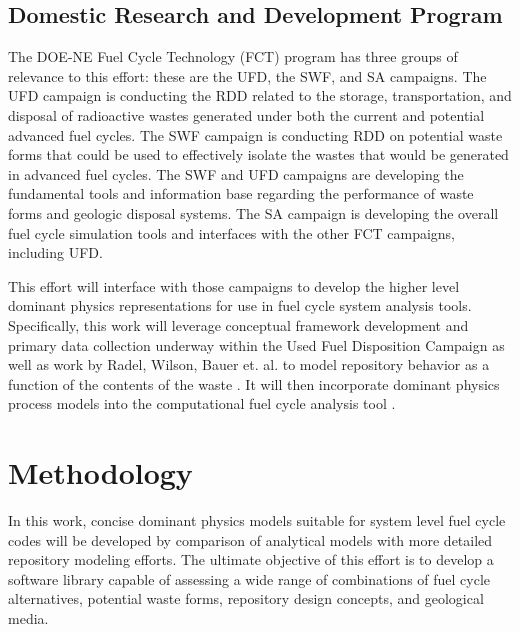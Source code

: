 \subsection{Domestic Research and Development Program}

The DOE-NE Fuel Cycle Technology (FCT) program has three groups of relevance to 
this effort: these are the \gls{UFD}, the \gls{SWF}, and \gls{SA} campaigns.  
The \gls{UFD} campaign is conducting the \gls{RDD} related to the storage, 
transportation, and disposal of radioactive wastes generated under both the 
current and potential advanced fuel cycles.  The SWF campaign is conducting 
\gls{RDD} on potential waste forms that could be used to effectively isolate the 
wastes that would be generated in advanced fuel cycles.  The \gls{SWF} and
\gls{UFD} campaigns are developing the fundamental tools and information base 
regarding the performance of waste forms and geologic disposal systems.  The 
\gls{SA} campaign is developing the overall fuel cycle simulation tools and 
interfaces with the other FCT campaigns, including \gls{UFD}.  

This effort will interface with those campaigns to develop the higher level
dominant physics representations for use in fuel cycle system analysis tools.
Specifically, this work will leverage conceptual framework development and
primary data collection underway within the Used Fuel Disposition Campaign as
well as work by Radel, Wilson, Bauer et. al. to model repository behavior as a
function of the contents of the waste \cite{radel_effect_2007}.  It will then 
incorporate dominant physics process models into the \Cyclus computational 
fuel cycle analysis tool \cite{huff_cyclus_2010}.




\section{Methodology} 


In this work, concise dominant physics models suitable for system level fuel 
cycle codes will be developed by comparison of analytical models with more 
detailed repository modeling efforts. The ultimate objective of this effort is 
to develop a software library capable of assessing a wide range of combinations 
of fuel cycle alternatives, potential waste forms, repository design concepts, 
and geological media. 


